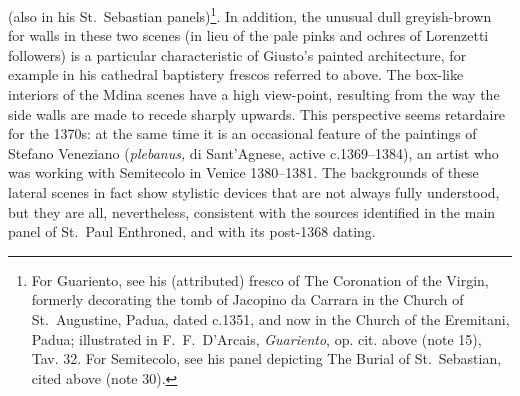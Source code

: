 \documentclass[a4paper,12pt]{article}
\begin{document}
(also in his St.~Sebastian panels)\footnote{For Guariento, see his
(attributed) fresco of The Coronation of the Virgin, formerly
decorating the tomb of Jacopino da Carrara in the Church of
St.~Augustine, Padua, dated c.1351, and now in the Church of the
Eremitani, Padua; illustrated in F.~F.~D'Arcais, \textit{Guariento},
op. cit. above (note 15), Tav. 32.  For Semitecolo, see his panel
depicting The Burial of St.~Sebastian, cited above (note 30).}. In
addition, the unusual dull greyish-brown for walls in these two scenes
(in lieu of the pale pinks and ochres of Lorenzetti followers) is a
particular characteristic of Giusto's painted architecture, for
example in his cathedral baptistery frescos referred to above. The
box-like interiors of the Mdina scenes have a high view-point,
resulting from the way the side walls are made to recede sharply
upwards.  This perspective seems retardaire for the 1370s: at the same
time it is an occasional feature of the paintings of Stefano Veneziano
(\textit{plebanus,} di Sant'Agnese, active c.1369--1384), an artist
who was working with Semitecolo in Venice 1380--1381. The backgrounds
of these lateral scenes in fact show stylistic devices that are not
always fully understood, but they are all, nevertheless, consistent
with the sources identified in the main panel of St.~Paul Enthroned,
and with its post-1368 dating.
\end{document}
